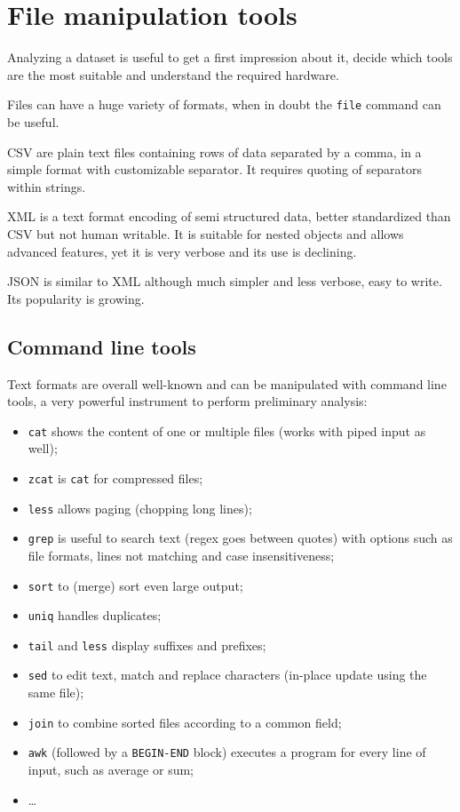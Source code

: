 \section{File manipulation tools}
Analyzing a dataset is useful to get a first impression about it, decide which tools are the most suitable and understand the required hardware.

Files can have a huge variety of formats, when in doubt the \texttt{file} command can be useful.

CSV are plain text files containing rows of data separated by a comma, in a simple format with customizable separator. It requires quoting of separators within strings.

XML is a text format encoding of semi structured data, better standardized than CSV but not human writable. It is suitable for nested objects and allows advanced features, yet it is very verbose and its use is declining.

JSON is similar to XML although much simpler and less verbose, easy to write. Its popularity is growing. 

\subsection{Command line tools}
Text formats are overall well-known and can be manipulated with command line tools, a very powerful instrument to perform preliminary analysis:
\begin{itemize}
	\item \texttt{cat} shows the content of one or multiple files (works with piped input as well);
	\item \texttt{zcat} is \texttt{cat} for compressed files;
	\item \texttt{less} allows paging (chopping long lines);
	\item \texttt{grep} is useful to search text (regex goes between quotes) with options such as file formats, lines not matching and case insensitiveness;
	\item \texttt{sort} to (merge) sort even large output;
	\item \texttt{uniq} handles duplicates;
	\item \texttt{tail} and \texttt{less} display suffixes and prefixes;
	\item \texttt{sed} to edit text, match and replace characters (in-place update using the same file);
	\item \texttt{join} to combine sorted files according to a common field;
	\item \texttt{awk} (followed by a \texttt{BEGIN-END} block) executes a program for every line of input, such as average or sum;
	\item \dots
\end{itemize}

